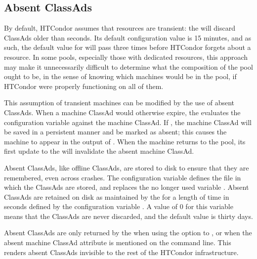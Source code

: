 \subsection{\label{sec:Absent-Ads}Absent ClassAds}

By default, HTCondor assumes that resources are transient: 
the 
will discard ClassAds older than  seconds.
Its default configuration value is 15 minutes, 
and as such, the default value for  will 
pass three times before HTCondor forgets about a resource.
In some pools, especially those with dedicated resources, 
this approach may make it unnecessarily difficult to determine 
what the composition of the pool ought to be, 
in the sense of knowing which machines would be in the pool,
if HTCondor were properly functioning on all of them.

This assumption of transient machines can be modified by 
the use of absent ClassAds.  
When a machine ClassAd would otherwise expire, 
the  evaluates the configuration variable
 against the machine ClassAd.
If , 
the machine ClassAd will be saved in a persistent manner and 
be marked as absent;
this causes the machine to appear in the output of 
.
When the machine returns to the pool, 
its first update to the  will 
invalidate the absent machine ClassAd.

Absent ClassAds, like offline ClassAds, 
are stored to disk to ensure that they are remembered,
even across  crashes.
The configuration variable 
defines the file in which the ClassAds are stored,
and replaces the no longer used variable .
Absent ClassAds are retained on disk as maintained by 
the  for a length of time in seconds defined by the
configuration variable .
A value of 0 for this variable means that the ClassAds are never discarded,
and the default value is thirty days.

Absent ClassAds are only returned by the  when 
using the  option to ,
or when the absent machine ClassAd attribute is mentioned on 
the  command line.  
This renders absent ClassAds invisible to the rest of the HTCondor infrastructure.
